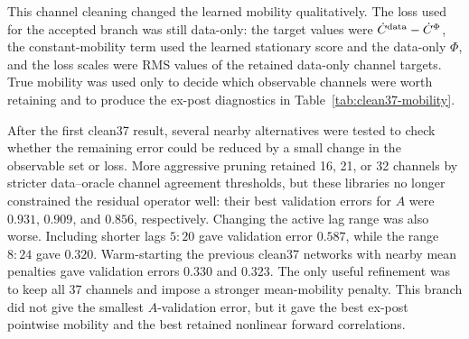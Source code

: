\documentclass[11pt]{article}
\begin{document}
This channel cleaning changed the learned mobility qualitatively.  The loss
used for the accepted branch was still data-only: the target values were
\(\dot C^{\rm data}-\dot C^\Phi\), the constant-mobility term used the learned
stationary score and the data-only \(\Phi\), and the loss scales were RMS values
of the retained data-only channel targets.  True mobility was used only to
decide which observable channels were worth retaining and to produce the
ex-post diagnostics in Table~\ref{tab:clean37-mobility}.

After the first clean37 result, several nearby alternatives were tested to
check whether the remaining error could be reduced by a small change in the
observable set or loss.  More aggressive pruning retained 16, 21, or 32
channels by stricter data--oracle channel agreement thresholds, but these
libraries no longer constrained the residual operator well: their best
validation errors for \(A\) were \(0.931\), \(0.909\), and \(0.856\),
respectively.  Changing the active lag range was also worse.  Including shorter
lags \(5{:}20\) gave validation error \(0.587\), while the range \(8{:}24\)
gave \(0.320\).  Warm-starting the previous clean37 networks with nearby mean
penalties gave validation errors \(0.330\) and \(0.323\).  The only useful
refinement was to keep all 37 channels and impose a stronger mean-mobility
penalty.  This branch did not give the smallest \(A\)-validation error, but it
gave the best ex-post pointwise mobility and the best retained nonlinear
forward correlations.
\end{document}
